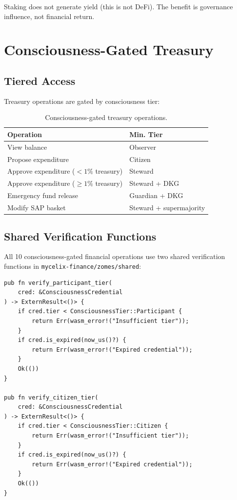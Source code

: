 \documentclass[11pt,twocolumn]{article}
\begin{document}
Staking does not generate yield (this is not DeFi). The benefit is
governance influence, not financial return.

\section{Consciousness-Gated Treasury}

\subsection{Tiered Access}

Treasury operations are gated by consciousness tier:

\begin{table}[h]
\centering
\begin{tabular}{ll}
\toprule
\textbf{Operation} & \textbf{Min. Tier} \\
\midrule
View balance & Observer \\
Propose expenditure & Citizen \\
Approve expenditure ($< 1\%$ treasury) & Steward \\
Approve expenditure ($\geq 1\%$ treasury) & Steward + DKG \\
Emergency fund release & Guardian + DKG \\
Modify SAP basket & Steward + supermajority \\
\bottomrule
\end{tabular}
\caption{Consciousness-gated treasury operations.}
\end{table}

\subsection{Shared Verification Functions}

All 10 consciousness-gated financial operations use two shared verification
functions in \texttt{mycelix-finance/zomes/shared}:

\begin{lstlisting}
pub fn verify_participant_tier(
    cred: &ConsciousnessCredential
) -> ExternResult<()> {
    if cred.tier < ConsciousnessTier::Participant {
        return Err(wasm_error!("Insufficient tier"));
    }
    if cred.is_expired(now_us()?) {
        return Err(wasm_error!("Expired credential"));
    }
    Ok(())
}

pub fn verify_citizen_tier(
    cred: &ConsciousnessCredential
) -> ExternResult<()> {
    if cred.tier < ConsciousnessTier::Citizen {
        return Err(wasm_error!("Insufficient tier"));
    }
    if cred.is_expired(now_us()?) {
        return Err(wasm_error!("Expired credential"));
    }
    Ok(())
}
\end{lstlisting}
\end{document}
